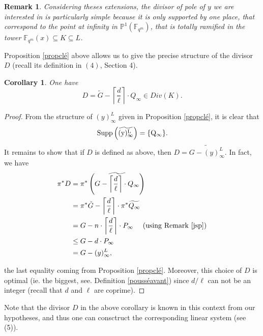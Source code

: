 \documentclass[10pt]{article}
\newtheorem{coro1}{Corollary}[]
\newtheorem{rq1}{Remark}[]
\newcommand{\s}{\vspace{0.3cm}}
\newcommand{\cd}{\cdot}
\newcommand{\fqm}{\mathbb{F}_{q^m}}
\newcommand{\su}{\subseteq}
\begin{document}
\s

\begin{rq1} \rm Considering theses extensions, the divisor of pole of $y$ we are interested in is particularly simple because it is only supported by one place, that correspond to the point at infinity in $\mathbb{P}^1(\fqm)$, that is totally ramified in the tower $\fqm(x)\su K \su L$.
\end{rq1}

\s

Proposition \ref{propclé} above allows us to give the precise structure of the divisor $D$ (recall its definition in $(4)$, Section 4).

\s

\begin{coro1} \label{diviseurDKummer}
One have
\[D = \tilde{G} - \left\lceil\frac{d}{\ell}\right\rceil \cd Q_{\infty} \in Div(K).\]
\end{coro1}

\s

\begin{proof}
From the structure of $(y)^L_{\infty}$ given in Proposition \ref{propclé}, it is clear that 
\[\rm{Supp}\left(\widetilde{(y)^L_{\infty}}\right) = \{Q_{\infty}\}.\]
It remains to show that if $D$ is defined as above, then $D = \widetilde{G - (y)^L_{\infty}}$. In fact, we have
\begin{align*}
\pi^*D &= \pi^* \left(\widetilde{G - \left\lceil\frac{d}{\ell}\right\rceil \cd Q_{\infty}}\right) \\
&= \pi^*\tilde{G} - \left\lceil\frac{d}{\ell}\right\rceil \cd \pi^*\widetilde{Q_{\infty}} \\
&= G - n \cd \left\lceil\frac{d}{\ell}\right\rceil \cd P_{\infty} \ \quad \rm (using \ Remark \ \ref{jsp}) \\
& \leq G - d \cd P_{\infty} \\
&= G-(y)^L_{\infty},
\end{align*}

the last equality coming from Proposition \ref{propclé}. Moreover, this choice of $D$ is optimal (ie. the biggest, see. Definition \ref{pousséavant}) since $d/\ell$ can not be an integer (recall that $d$ and $\ell$ are coprime).
\end{proof}

\s

Note that the divisor $D$ in the above corollary is known in this context from our hypotheses, and thus one can consctruct the corresponding linear system (see (5)).
\end{document}
